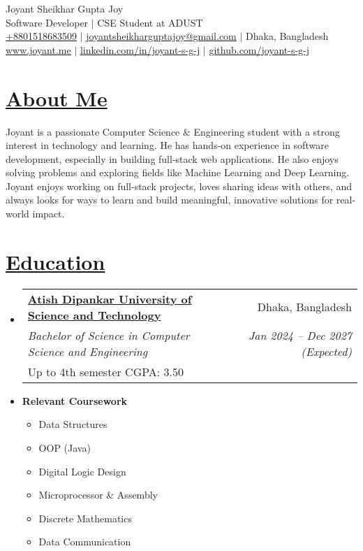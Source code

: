 \documentclass[a4paper, 11pt]{article}
\newcommand{\resumeSection}[2]{
  \section{\textbf{\href{#1}{#2}}}
}
\newcommand{\resumeEduSubheading}[6]{
  \vspace{-2pt}\item
    \begin{tabularx}{\textwidth}[t]{X r}
      \textbf{\href{#1}{#2}} & #3 \\
      {\textit{\small #4}} & \textit{\small #5} \\
      {\small #6}
    \end{tabularx}\vspace{-7pt}
}
\newcommand{\resumeCourseheading}[1]{
  \vspace{-2pt}\item
    \textbf{#1}\vspace{-7pt} \\
}
\newcommand{\resumeCoursework}[1]{
  \vspace{2pt}
  \begin{multicols}{3}
    \begin{itemize}[leftmargin=*, label=\textbullet, itemsep=2pt]
      #1
    \end{itemize}
  \end{multicols}
}
\newcommand{\resumeSubHeadingListStart}{\begin{itemize}[leftmargin=0in, label={}]}
\newcommand{\resumeSubHeadingListEnd}{\end{itemize}}
\begin{document}
{\Huge \rmfamily Joyant Sheikhar Gupta Joy} \\ \vspace{1pt}
\small Software Developer $|$ CSE Student at ADUST \\ \vspace{2pt}
\href{tel:+8801518683509}{\underline{+8801518683509}} $|$ 
\href{mailto:joyantsheikharguptajoy@gmail.com}{\underline{joyantsheikharguptajoy@gmail.com}} $|$ 
Dhaka, Bangladesh \\ \vspace{1pt}
\href{https://joyant.me/}{\underline{www.joyant.me}} $|$
\href{https://www.linkedin.com/in/joyant-s-g-j/}{\underline{linkedin.com/in/joyant-s-g-j}} $|$
\href{https://github.com/joyant-s-g-j}{\underline{github.com/joyant-s-g-j}}

\resumeSection{https://joyant.me/about}{About Me}
    Joyant is a passionate Computer Science \& Engineering student with a strong interest in technology and learning. He has hands-on experience in software development, especially in building full-stack web applications. He also enjoys solving problems and exploring fields like Machine Learning and Deep Learning. Joyant enjoys working on full-stack projects, loves sharing ideas with others, and always looks for ways to learn and build meaningful, innovative solutions for real-world impact.

\resumeSection{https://joyant.me/education}{Education}
  \resumeSubHeadingListStart
    \resumeEduSubheading
        {https://www.adust.edu.bd/\#}{Atish Dipankar University of Science and Technology}{Dhaka, Bangladesh}
        {Bachelor of Science in Computer Science and Engineering }{Jan 2024 -- Dec 2027 (Expected)}
        {Up to 4th semester CGPA: 3.50}
    \resumeCourseheading{Relevant Coursework}
        \resumeCoursework{
            \item Data Structures
            \item OOP (Java)
            \item Digital Logic Design
            \item Microprocessor \& Assembly
            \item Discrete Mathematics
            \item Data Communication
        }
  \resumeSubHeadingListEnd
\end{document}

